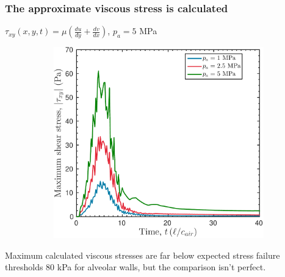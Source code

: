 \begin{frame}\frametitle{The approximate viscous stress is calculated}
  $\tau_{xy}(x,y,t) = \mu\left(\frac{du}{dy}+ \frac{dv}{dx}\right)$, \qquad$p_a = 5$ MPa
  \begin{figure}
    \captionsetup[subfigure]{labelformat=empty}
    \begin{subfigure}{0.5\textwidth}
      \includegraphics[width=\textwidth]{../figs/lung_figs/rmawave_1_A10,25,50_a30_tauxy_27-Feb-2017}
    \end{subfigure}
  \end{figure}
  Maximum calculated viscous stresses are far below expected stress
  failure thresholds $80$ kPa for alveolar walls, but the comparison
  isn't perfect.
\end{frame}


